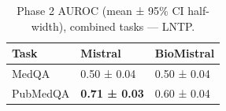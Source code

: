 \begin{table}
\caption{Phase 2 AUROC (mean ± 95\% CI half-width), combined tasks — LNTP.}
\label{tab:phase2_auroc_all_lntp}
\begin{tabular}{lll}
\toprule
Task & Mistral & BioMistral \\
\midrule
MedQA & 0.50 ± 0.04 & 0.50 ± 0.04 \\
PubMedQA & \textbf{0.71 ± 0.03} & 0.60 ± 0.04 \\
\bottomrule
\end{tabular}
\end{table}
